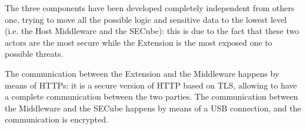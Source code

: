 The three components have been developed completely independent from others one, trying to move all the possible logic and sensitive data to the lowest level (i.e. the Host Middleware and the SECube): this is due to the fact that these two actors are the most secure while the Extension is the most exposed one to possible threats. \bigskip

The communication between the Extension and the Middleware happens by means of HTTPs: it is a secure version of HTTP based on TLS, allowing to have a complete communication between the two parties. The communication between the Middleware and the SECube happens by means of a USB connection, and the communication is encrypted. 

